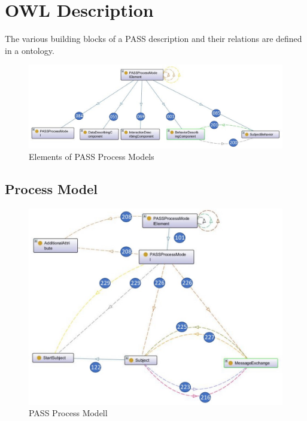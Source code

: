 \newpage

\section{OWL Description}

The various building blocks of a PASS description and their relations are defined in a ontology.  

\begin{figure}[ph]
	\centering
	\includegraphics[width=1.0\linewidth]{20181026-Ontologie-Bilder/Grafiken-Ontologie/SUbject-Interaction/20171217-PASSProcessModellElement}
	\caption[Elements of PASS Process Models]{Elements of PASS Process Models}
	\label{fig:20171217-passprocessmodellelement}
\end{figure}


\subsection{Process Model}


\begin{figure}[ph]
	\centering
	\includegraphics[width=1.0\linewidth]{20181026-Ontologie-Bilder/Grafiken-Ontologie/SUbject-Interaction/20181217-PASSProcessModel}
	\caption[PASS Process Modell]{PASS Process Modell}
	\label{fig:20181217-passprocessmodel}
\end{figure}













